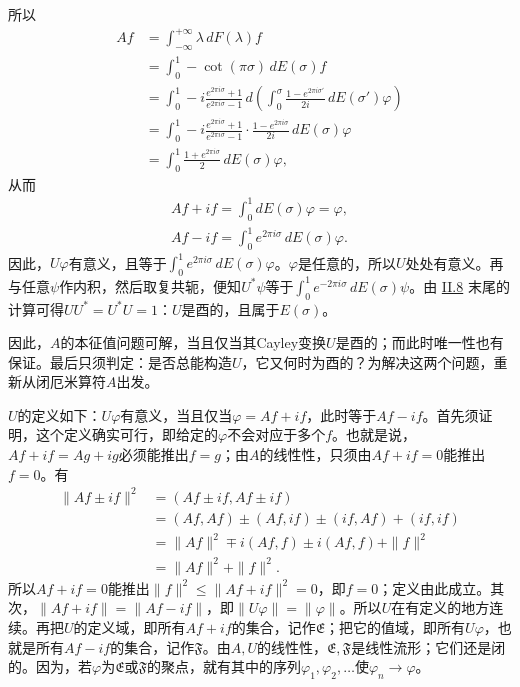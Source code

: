 \documentclass[fontsize=13pt,twoside,openany,headings=normal,parskip=false,bookmarkpackage=false,DIV=calc]{scrbook}
\begin{document}
\hypertarget{origpage-84}{}\label{origpage-84}所以
\begin{align*}
Af&=\int_{-\infty}^{+\infty}\lambda\,dF(\lambda)f\\
&=\int_0^1-\cot(\pi\sigma)\,dE(\sigma)f\\
&=\int_0^1-i\frac{e^{2\pi i\sigma}+1}{e^{2\pi i\sigma}-1}\,
d\left(\int_0^\sigma\frac{1-e^{2\pi i\sigma'}}{2i}\,dE(\sigma')\varphi\right)\\
&=\int_0^1-i\frac{e^{2\pi i\sigma}+1}{e^{2\pi i\sigma}-1}\cdot
\frac{1-e^{2\pi i\sigma}}{2i}\,dE(\sigma)\varphi\\
&=\int_0^1\frac{1+e^{2\pi i\sigma}}2\,dE(\sigma)\varphi,
\end{align*}
从而
\begin{gather*}
Af+if=\int_0^1dE(\sigma)\varphi=\varphi,\\
Af-if=\int_0^1e^{2\pi i\sigma}\,dE(\sigma)\varphi.
\end{gather*}
因此，$U\varphi$有意义，且等于$\int_0^1e^{2\pi i\sigma}\,dE(\sigma)\varphi$。$\varphi$是任意的，所以$U$处处有意义。再与任意$\psi$作内积，然后取复共轭，便知$U^*\psi$等于$\int_0^1e^{-2\pi i\sigma}\,dE(\sigma)\psi$。由 \hyperref[sec:II.8]{II.8} 末尾的计算可得$UU^*=U^*U=1$：$U$是酉的，且属于$E(\sigma)$。

因此，$A$的本征值问题可解，当且仅当其Cayley变换$U$是酉的；而此时唯一性也有保证。最后只须判定：是否总能构造$U$，它又何时为酉的？为解决这两个问题，重新从闭厄米算符$A$出发。

$U$的定义如下：$U\varphi$有意义，当且仅当$\varphi=Af+if$，此时等于$Af-if$。首先须证明，这个定义确实可行，即给定的$\varphi$不会对应于多个$f$。也就是说，$Af+if=Ag+ig$必须能推出$f=g$；由$A$的线性性，只须由$Af+if=0$能推出$f=0$。有
\begin{align*}
\|Af\pm if\|^2&=(Af\pm if,Af\pm if)\\
&=(Af,Af)\pm(Af,if)\pm(if,Af)+(if,if)\\
&=\|Af\|^2\mp i(Af,f)\pm i(Af,f)+\|f\|^2\\
&=\|Af\|^2+\|f\|^2.
\end{align*}
所以$Af+if=0$能推出$\|f\|^2\leq\|Af+if\|^2=0$，即$f=0$；定义由此成立。其次，$\|Af+if\|=\|Af-if\|$，即$\|U\varphi\|=\|\varphi\|$。所以$U$在有定义的地方连续。再把$U$的定义域，即所有$Af+if$的集合，记作$\mathfrak E$；把它的值域，即所有$U\varphi$，也就是所有$Af-if$的集合，记作$\mathfrak F$。由$A,\allowbreak U$的线性性，$\mathfrak E,\allowbreak \mathfrak F$是线性流形；它们还是闭的。因为，若$\varphi$为$\mathfrak E$或$\mathfrak F$的聚点，就有其中的序列$\varphi_1,\allowbreak \varphi_2,\allowbreak \ldots$使$\varphi_n\to\varphi$。
\end{document}
